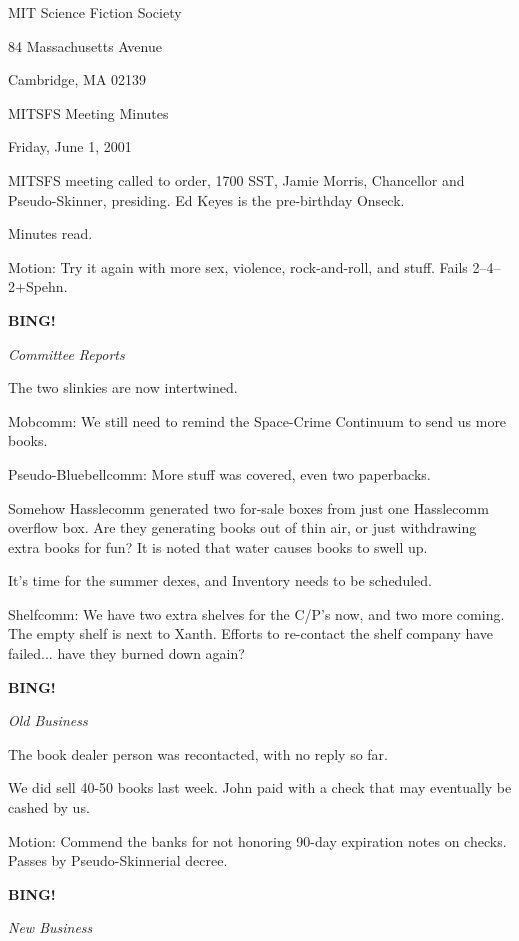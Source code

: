 \documentclass[12pt]{article}
\newcommand{\bing}{{\bf BING!} }
\newcommand{\goto}[1]{\bing \vskip 12pt \centerline{{\em{#1}}}}
\begin{document}
\begin{center}

MIT Science Fiction Society 

84 Massachusetts Avenue

Cambridge, MA 02139

\vspace{12pt}

MITSFS Meeting Minutes 

Friday, June 1, 2001

\end{center}
 
\vspace{18pt}

\setlength{\parskip}{6pt}

\noindent
MITSFS meeting called to order, 1700 SST, Jamie Morris, Chancellor and
Pseudo-Skinner, presiding.  Ed Keyes is the pre-birthday Onseck.

Minutes read.

Motion: Try it again with more sex, violence, rock-and-roll, and stuff.
Fails 2--4--2+Spehn.

\goto{Committee Reports}

The two slinkies are now intertwined.

Mobcomm: We still need to remind the Space-Crime Continuum to send
us more books.

Pseudo-Bluebellcomm: More stuff was covered, even two paperbacks.

Somehow Hasslecomm generated two for-sale boxes from just one Hasslecomm
overflow box.  Are they generating books out of thin air, or just
withdrawing extra books for fun?  It is noted that water causes books
to swell up.

It's time for the summer dexes, and Inventory needs to be scheduled.

Shelfcomm: We have two extra shelves for the C/P's now, and two more
coming.  The empty shelf is next to Xanth.  Efforts to re-contact the
shelf company have failed... have they burned down again?

\goto{Old Business}

The book dealer person was recontacted, with no reply so far.

We did sell 40-50 books last week.  John paid with a check that may
eventually be cashed by us.

Motion: Commend the banks for not honoring 90-day expiration notes
on checks.  Passes by Pseudo-Skinnerial decree.

\goto{New Business}
\end{document}
